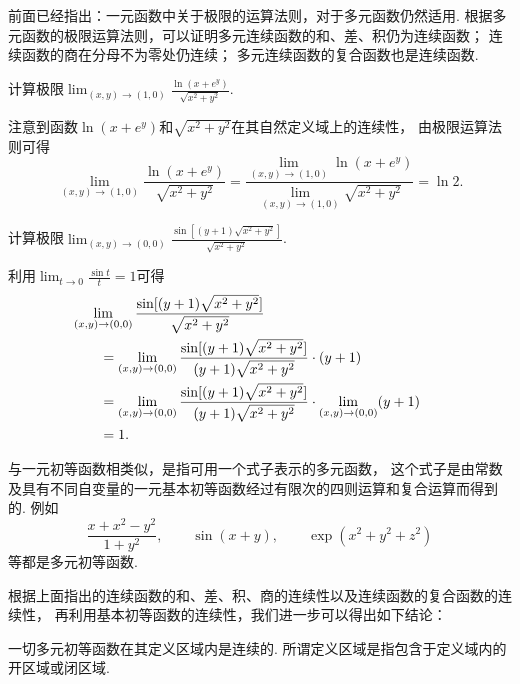 前面已经指出：一元函数中关于极限的运算法则，对于多元函数仍然适用.
根据多元函数的极限运算法则，可以证明多元连续函数的和、差、积仍为连续函数；
连续函数的商在分母不为零处仍连续；
多元连续函数的复合函数也是连续函数.

\begin{example}
计算极限\(\lim_{(x,y)\to(1,0)} \frac{\ln(x+e^y)}{\sqrt{x^2+y^2}}\).
\begin{solution}
注意到函数\(\ln(x+e^y)\)和\(\sqrt{x^2+y^2}\)在其自然定义域上的连续性，
由极限运算法则可得\begin{equation*}
	\lim_{(x,y)\to(1,0)} \frac{\ln(x+e^y)}{\sqrt{x^2+y^2}}
	= \frac{\lim\limits_{(x,y)\to(1,0)} \ln(x+e^y)}
		{\lim\limits_{(x,y)\to(1,0)} \sqrt{x^2+y^2}}
	= \ln2.
\end{equation*}
\end{solution}
\end{example}
\begin{example}
计算极限\(\lim_{(x,y)\to(0,0)} \frac{\sin[(y+1)\sqrt{x^2+y^2}]}{\sqrt{x^2+y^2}}\).
\begin{solution}
利用\(\lim_{t\to0} \frac{\sin t}{t} = 1\)可得\begin{align*}
	&\hspace{-20pt}
	\lim_{(x,y)\to(0,0)} \frac{\sin[(y+1)\sqrt{x^2+y^2}]}{\sqrt{x^2+y^2}} \\
	&= \lim_{(x,y)\to(0,0)} \frac{\sin[(y+1)\sqrt{x^2+y^2}]}{(y+1)\sqrt{x^2+y^2}}\cdot(y+1) \\
	&= \lim_{(x,y)\to(0,0)} \frac{\sin[(y+1)\sqrt{x^2+y^2}]}{(y+1)\sqrt{x^2+y^2}}
		\cdot \lim_{(x,y)\to(0,0)} (y+1) \\
	&= 1.
\end{align*}
\end{solution}
\end{example}

与一元初等函数相类似，是指可用一个式子表示的多元函数，
这个式子是由常数及具有不同自变量的一元基本初等函数经过有限次的四则运算和复合运算而得到的.
例如\begin{equation*}
	\frac{x+x^2-y^2}{1+y^2},
	\qquad
	\sin(x+y),
	\qquad
	\exp(x^2+y^2+z^2)
\end{equation*}等都是多元初等函数.

根据上面指出的连续函数的和、差、积、商的连续性以及连续函数的复合函数的连续性，
再利用基本初等函数的连续性，我们进一步可以得出如下结论：

一切多元初等函数在其定义区域内是连续的.
所谓定义区域是指包含于定义域内的开区域或闭区域.

